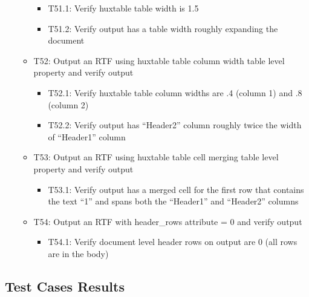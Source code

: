 \documentclass[]{article}
\providecommand{\tightlist}{%
  \setlength{\itemsep}{0pt}\setlength{\parskip}{0pt}}
\begin{document}
\begin{itemize}
\begin{itemize}
    \begin{itemize}
    \tightlist
    \item
      T51.1: Verify huxtable table width is 1.5
    \item
      T51.2: Verify output has a table width roughly expanding the
      document
    \end{itemize}
  \item
    T52: Output an RTF using huxtable table column width table level
    property and verify output

    \begin{itemize}
    \tightlist
    \item
      T52.1: Verify huxtable table column widths are .4 (column 1) and
      .8 (column 2)
    \item
      T52.2: Verify output has ``Header2'' column roughly twice the
      width of ``Header1'' column
    \end{itemize}
  \item
    T53: Output an RTF using huxtable table cell merging table level
    property and verify output

    \begin{itemize}
    \tightlist
    \item
      T53.1: Verify output has a merged cell for the first row that
      contains the text ``1'' and spans both the ``Header1'' and
      ``Header2'' columns
    \end{itemize}
  \item
    T54: Output an RTF with header\_rows attribute = 0 and verify output

    \begin{itemize}
    \tightlist
    \item
      T54.1: Verify document level header rows on output are 0 (all rows
      are in the body)
    \end{itemize}
  \end{itemize}
\end{itemize}

\hypertarget{test-cases-results}{%
\subsection{Test Cases Results}\label{test-cases-results}}
\end{document}
